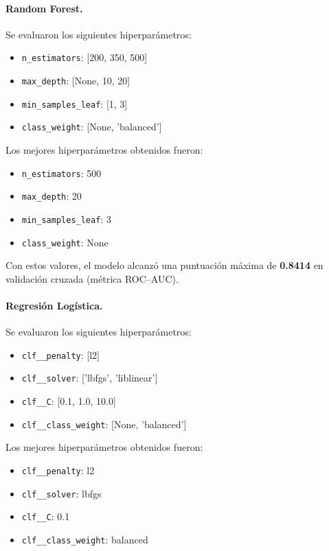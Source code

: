 \documentclass[12pt]{article}
\begin{document}
\paragraph{Random Forest.}
Se evaluaron los siguientes hiperparámetros:

\begin{itemize}
    \item \texttt{n\_estimators}: [200, 350, 500]
    \item \texttt{max\_depth}: [None, 10, 20]
    \item \texttt{min\_samples\_leaf}: [1, 3]
    \item \texttt{class\_weight}: [None, 'balanced']
\end{itemize}

Los mejores hiperparámetros obtenidos fueron:

\begin{itemize}
    \item \texttt{n\_estimators}: 500
    \item \texttt{max\_depth}: 20
    \item \texttt{min\_samples\_leaf}: 3
    \item \texttt{class\_weight}: None
\end{itemize}

Con estos valores, el modelo alcanzó una puntuación máxima de \textbf{0.8414} en validación cruzada (métrica ROC–AUC).

\paragraph{Regresión Logística.}
Se evaluaron los siguientes hiperparámetros:

\begin{itemize}
    \item \texttt{clf\_\_penalty}: [l2]
    \item \texttt{clf\_\_solver}: ['lbfgs', 'liblinear']
    \item \texttt{clf\_\_C}: [0.1, 1.0, 10.0]
    \item \texttt{clf\_\_class\_weight}: [None, 'balanced']
\end{itemize}

Los mejores hiperparámetros obtenidos fueron:

\begin{itemize}
    \item \texttt{clf\_\_penalty}: l2
    \item \texttt{clf\_\_solver}: lbfgs
    \item \texttt{clf\_\_C}: 0.1
    \item \texttt{clf\_\_class\_weight}: balanced
\end{itemize}
\end{document}
